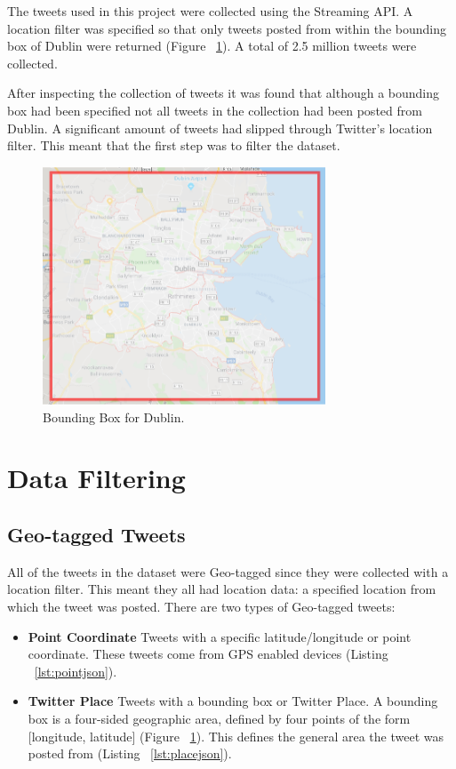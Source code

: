 The tweets used in this project were collected using the Streaming API. A location filter was specified so that only tweets posted from within the bounding box of Dublin were returned (Figure ~\ref{fig:dublinBB}). A total of 2.5 million tweets were collected.

After inspecting the collection of tweets it was found that although a bounding box had been specified not all tweets in the collection had been posted from Dublin. A significant amount of tweets had slipped through Twitter's location filter. This meant that the first step was to filter the dataset.

\begin{figure}[h!]
\centering
\includegraphics[width=0.75\textwidth]{design_and_methodology/dublinBB.png}
\caption{\label{fig:dublinBB} Bounding Box for Dublin.}
\end{figure}

\section{Data Filtering}

\subsection*{Geo-tagged Tweets}

All of the tweets in the dataset were Geo-tagged since they were collected with a location filter. This meant they all had location data: a specified location from which the tweet was posted. There are two types of Geo-tagged tweets:
\begin{itemize}
    \item \textbf{Point Coordinate}\newline
    Tweets with a specific latitude/longitude or point coordinate. These tweets come from GPS enabled devices (Listing ~\ref{lst:pointjson}).
    \item \textbf{Twitter Place}\newline
    Tweets with a bounding box or Twitter Place. A bounding box is a four-sided geographic area, defined by four points of the form [longitude, latitude] (Figure ~\ref{fig:dublinBB}). This defines the general area the tweet was posted from (Listing ~\ref{lst:placejson}). \newline
\end{itemize}

